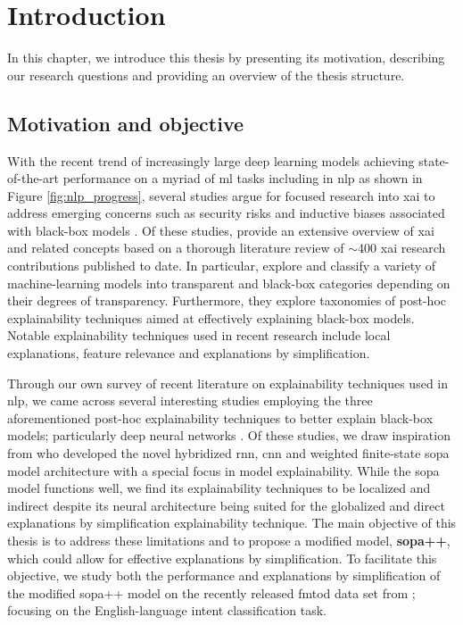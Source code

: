\chapter{Introduction}

\label{chapter:introduction}

In this chapter, we introduce this thesis by presenting its motivation,
describing our research questions and providing an overview of the thesis
structure.

\section{Motivation and objective}

With the recent trend of increasingly large deep learning models achieving
state-of-the-art performance on a myriad of \ac{ml} tasks including in \ac{nlp}
as shown in Figure \ref{fig:nlp_progress}, several studies argue for focused
research into \ac{xai} to address emerging concerns such as security risks and
inductive biases associated with black-box models
\citep{doran2017does,townsend2019extracting,danilevsky2020survey,arrieta2020explainable}.
Of these studies, \citet{arrieta2020explainable} provide an extensive overview
of \ac{xai} and related concepts based on a thorough literature review of
$\sim$400 \ac{xai} research contributions published to date. In particular,
\citet{arrieta2020explainable} explore and classify a variety of
machine-learning models into transparent and black-box categories depending on
their degrees of transparency. Furthermore, they explore taxonomies of post-hoc
explainability techniques aimed at effectively explaining black-box models.
Notable explainability techniques used in recent research include local
explanations, feature relevance and explanations by simplification.

Through our own survey of recent literature on explainability techniques used in
\ac{nlp}, we came across several interesting studies employing the three
aforementioned post-hoc explainability techniques to better explain black-box
models; particularly deep neural networks
\citep{schwartz2018sopa,peng2018rational,suresh-etal-2019-distilling,wang2019state,jiang2020cold}.
Of these studies, we draw inspiration from \citet{schwartz2018sopa} who
developed the novel hybridized \ac{rnn}, \ac{cnn} and weighted finite-state
\ac{sopa} model architecture with a special focus in model explainability. While
the \ac{sopa} model functions well, we find its explainability techniques to be
localized and indirect despite its neural architecture being suited for the
globalized and direct explanations by simplification explainability technique.
The main objective of this thesis is to address these limitations and to propose
a modified model, \textbf{\ac{sopa}++}, which could allow for effective explanations
by simplification. To facilitate this objective, we study both the performance and
explanations by simplification of the modified \ac{sopa}++ model on the recently
released \ac{fmtod} data set from \citet{schuster-etal-2019-cross-lingual};
focusing on the English-language intent classification task.

